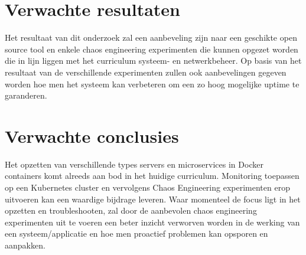\section{Verwachte resultaten}
\label{sec:verwachte_resultaten}

Het resultaat van dit onderzoek zal een aanbeveling zijn naar een geschikte open source tool en enkele chaos engineering experimenten die kunnen opgezet worden die in lijn liggen met het curriculum systeem- en netwerkbeheer. Op basis van het resultaat van de verschillende experimenten zullen ook aanbevelingen gegeven worden hoe men het systeem kan verbeteren om een zo hoog mogelijke uptime te garanderen. 

\section{Verwachte conclusies}
\label{sec:verwachte_conclusies}

Het opzetten van verschillende types servers en microservices in Docker containers komt alreeds aan bod in het huidige curriculum. Monitoring toepassen op een Kubernetes cluster en vervolgens Chaos Engineering experimenten erop uitvoeren kan een waardige bijdrage leveren.
Waar momenteel de focus ligt in het opzetten en troubleshooten, zal door de aanbevolen chaos engineering experimenten uit te voeren een beter inzicht verworven worden in de werking van een systeem/applicatie en hoe men proactief problemen kan opsporen en aanpakken. 


